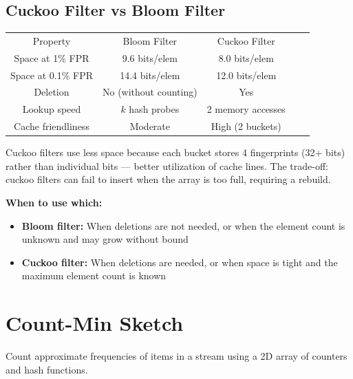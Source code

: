 \subsection{Cuckoo Filter vs Bloom Filter}

\begin{center}
\begin{tabular}{ccccc}
\toprule
Property & Bloom Filter & Cuckoo Filter \\
Space at 1\% FPR & 9.6 bits/elem & 8.0 bits/elem \\
Space at 0.1\% FPR & 14.4 bits/elem & 12.0 bits/elem \\
Deletion & No (without counting) & Yes \\
Lookup speed & $k$ hash probes & 2 memory accesses \\
Cache friendliness & Moderate & High (2 buckets) \\

\bottomrule
\end{tabular}
\end{center}

Cuckoo filters use less space because each bucket stores 4 fingerprints (32+ bits) rather than individual bits — better utilization of cache lines. The trade-off: cuckoo filters can fail to insert when the array is too full, requiring a rebuild.

\textbf{When to use which:}
\begin{itemize}
\item \textbf{Bloom filter:} When deletions are not needed, or when the element count is unknown and may grow without bound
\item \textbf{Cuckoo filter:} When deletions are needed, or when space is tight and the maximum element count is known
\end{itemize}

\section{Count-Min Sketch}

Count approximate frequencies of items in a stream using a 2D array of counters and hash functions.

